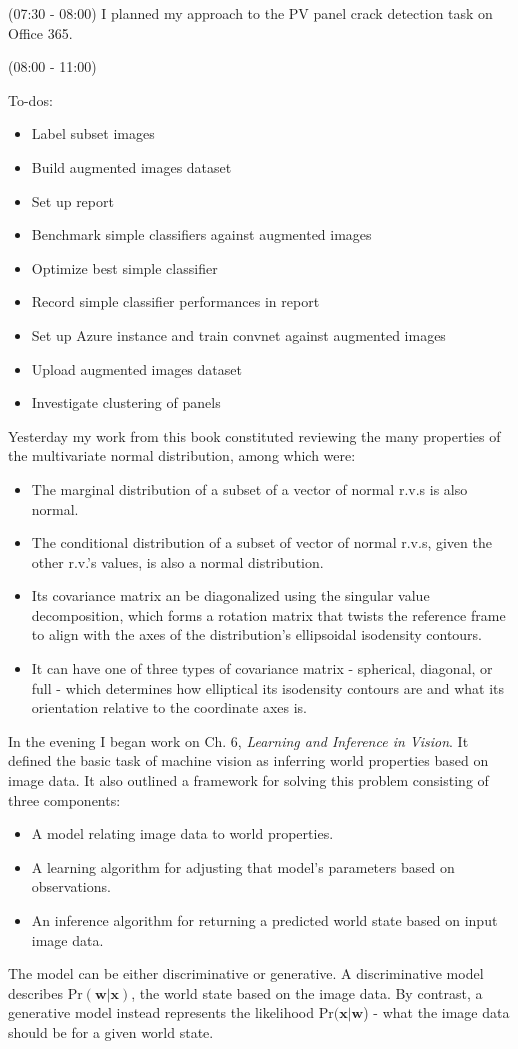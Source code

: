 \documentclass[idxtotoc,hyperref,openany]{labbook} %
\begin{document}
(07:30 - 08:00) I planned my approach to the PV panel crack detection task on Office 365.

(08:00 - 11:00) 

To-dos:
\begin{itemize}
	\item Label subset images
	\item Build augmented images dataset
	\item Set up report
	\item Benchmark simple classifiers against augmented images
	\item Optimize best simple classifier
	\item Record simple classifier performances in report
	\item Set up Azure instance and train convnet against augmented images
	\item Upload augmented images dataset
	\item Investigate clustering of panels
\end{itemize}

Yesterday my work from this book constituted reviewing the many properties of the multivariate normal distribution, among which were:
\begin{itemize}
	\item The marginal distribution of a subset of a vector of normal r.v.s is also normal.
	\item The conditional distribution of a subset of vector of normal r.v.s, given the other r.v.'s values, is also a normal distribution.
	\item Its covariance matrix an be diagonalized using the singular value decomposition, which forms a rotation matrix that twists the reference frame to align with the axes of the distribution's ellipsoidal isodensity contours.
	\item It can have one of three types of covariance matrix - spherical, diagonal, or full - which determines how elliptical its isodensity contours are and what its orientation relative to the coordinate axes is.
\end{itemize}
In the evening I began work on Ch. 6, \emph{Learning and Inference in Vision}. It defined the basic task of machine vision as inferring world properties based on image data. It also outlined a framework for solving this problem consisting of three components:
\begin{itemize}
	\item A model relating image data to world properties.
	\item A learning algorithm for adjusting that model's parameters based on observations.
	\item An inference algorithm for returning a predicted world state based on input image data.
\end{itemize}
The model can be either discriminative or generative. A discriminative model describes $\text{Pr}(\mathbf{w}|\mathbf{x})$, the world state based on the image data. By contrast, a generative model instead represents the likelihood $\text{Pr}(\mathbf{x}|\mathbf{w}$) - what the image data should be for a given world state.
\end{document}
